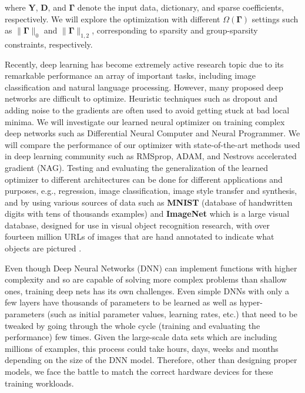 \documentclass[a4paper, 11pt]{article}
\begin{document}
\noindent
where $\mathbf{Y}$, $\mathbf{D}$, and $\mathbf{\Gamma}$ denote the input data, dictionary, and sparse coefficients, respectively. We will explore the optimization with different $\Omega (\mathbf{\Gamma})$ settings such as $\|\mathbf{\Gamma}\|_0$ and $\|\mathbf{\Gamma}\|_{1,2}$, corresponding to sparsity and group-sparsity constraints, respectively.

Recently, deep learning has become extremely active research topic due to its remarkable performance an array of important tasks, including image classification and natural language processing. However, many proposed deep networks are difficult to optimize. Heuristic techniques such as dropout and adding noise to the gradients are often used to avoid getting stuck at bad local minima. We will investigate our learned neural optimizer on training complex deep networks such as Differential Neural Computer and Neural Programmer. We will compare the performance of our optimizer with state-of-the-art methods used in deep learning community such as RMSprop, ADAM, and Nestrov\textsc{}s accelerated gradient (NAG). Testing and evaluating the generalization of the learned optimizer to different architectures can be done for different applications and purposes, e.g., regression, image classification, image style transfer and synthesis, and by using various sources of data such as \textbf{MNIST} \cite{MNIST} (database of handwritten digits with tens of thousands examples) and \textbf{ImageNet} which is a large visual database, designed for use in visual object recognition research, with over fourteen million URLs of images that are hand annotated to indicate what objects are pictured \cite{ImageNet}. 

Even though Deep Neural Networks (DNN) can implement functions with higher complexity and so are capable of solving more complex problems than shallow ones, training deep nets has its own challenges. Even simple DNNs with only a few layers have thousands of parameters to be learned as well as hyper-parameters (such as initial parameter values, learning rates, etc.) that need to be tweaked by going through the whole cycle (training and evaluating the performance) few times. Given the large-scale data sets which are including millions of examples, this process could take hours, days, weeks and months depending on the size of the DNN model. Therefore, other than designing proper models, we face the battle to match the correct hardware devices for these training workloads. 
\end{document}

